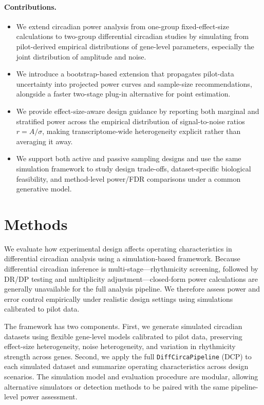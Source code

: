 \documentclass{article}
\newcommand{\software}[1]{\texttt{#1}}
\begin{document}
\paragraph{Contributions.}
\begin{itemize}
\item We extend circadian power analysis from one-group fixed-effect-size calculations to two-group differential circadian studies by simulating from pilot-derived empirical distributions of gene-level parameters, especially the joint distribution of amplitude and noise.
\item We introduce a bootstrap-based extension that propagates pilot-data uncertainty into projected power curves and sample-size recommendations, alongside a faster two-stage plug-in alternative for point estimation.
\item We provide effect-size-aware design guidance by reporting both marginal and stratified power across the empirical distribution of signal-to-noise ratios $r=A/\sigma$, making transcriptome-wide heterogeneity explicit rather than averaging it away.
\item We support both active and passive sampling designs and use the same simulation framework to study design trade-offs, dataset-specific biological feasibility, and method-level power/FDR comparisons under a common generative model.
\end{itemize}

\section{Methods}

We evaluate how experimental design affects operating characteristics in
differential circadian analysis using a simulation-based framework. Because
differential circadian inference is multi-stage---rhythmicity screening,
followed by DR/DP testing and multiplicity adjustment---closed-form power
calculations are generally unavailable for the full analysis pipeline. We
therefore assess power and error control empirically under realistic design
settings using simulations calibrated to pilot data.

The framework has two components. First, we generate simulated circadian
datasets using flexible gene-level models calibrated to pilot data, preserving
effect-size heterogeneity, noise heterogeneity, and variation in rhythmicity
strength across genes. Second, we apply the full
\software{DiffCircaPipeline} (DCP) to each simulated dataset and summarize
operating characteristics across design scenarios. The simulation model and
evaluation procedure are modular, allowing alternative simulators or detection
methods to be paired with the same pipeline-level power assessment.
\end{document}
